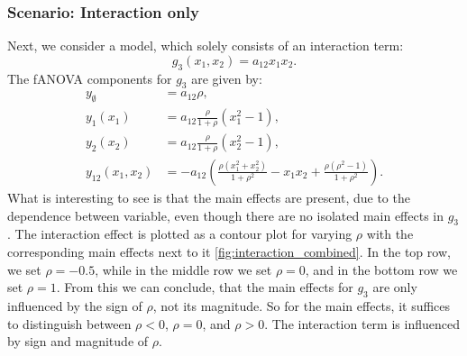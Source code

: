\subsubsection*{Scenario: Interaction only}
Next, we consider a model, which solely consists of an interaction term:
$$g_3(x_1, x_2) = a_{12} x_1 x_2.$$
The fANOVA components for $g_3$ are given by:
\begin{align*}
    y_{\emptyset} &= a_{12} \rho, \\
    y_{1}(x_1) &= a_{12} \frac{\rho}{1+ \rho} (x_1^2 - 1), \\
    y_{2}(x_2) &= a_{12} \frac{\rho}{1+ \rho} (x_2^2 - 1), \\
    y_{12}(x_1,x_2) 
&= -a_{12}\!\left(
    \frac{\rho(x_1^2+x_2^2)}{1+\rho^2} 
    - x_1 x_2 
    + \frac{\rho(\rho^2-1)}{1+\rho^2}
   \right).
\end{align*}
What is interesting to see is that the main effects are present, due to the dependence between variable, even though there are no isolated main effects in $g_3$.
The interaction effect is plotted as a contour plot for varying $\rho$ with the corresponding main effects next to it \autoref{fig:interaction_combined}.
In the top row, we set $\rho = -0.5$, while in the middle row we set $\rho = 0$, and in the bottom row we set $\rho = 1$. From this we can conclude, that the main effects for $g_3$ are only influenced by the sign of $\rho$, not its magnitude. So for the main effects, it suffices to distinguish between $\rho < 0$, $\rho = 0$, and $\rho > 0$. The interaction term is influenced by sign and magnitude of $\rho$.
